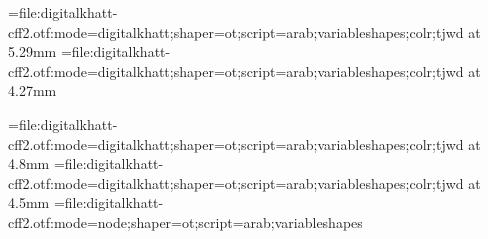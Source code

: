 \edef\pdfcompresslevel{\pdfvariable compresslevel}
\edef\pdfobjcompresslevel{\pdfvariable objcompresslevel}
\edef\pdfgentounicode{\pdfvariable gentounicode}
\newattribute{\tajweedatt}
\newattribute{\sajdaatt}



\newbox\ayaframe
\newcount\suranum


\def\suraline#1{%
\global\advance\suranum by1%
\leavevmode\raise1.2em\hbox to 0pt{\pdfbookmark{\the\suranum. #1}{sura\the\suranum}}%
\hbox to 0pt{\copy\ayaframe\hss}\centerline{\medinasura\textdir TRT#1}%
}%
\def\bismline#1{\centerline{\medinasura\textdir TRT#1}}



\def\sajdabar#1{\setattribute{\sajdaatt}{1}#1\unsetattribute{\sajdaatt}\directlua{addsajdacallback()}%
}

\newdimen\scaledsize 
{}\textwidth%

\font\medinafontvar={file:digitalkhatt-cff2.otf:mode=digitalkhatt;shaper=ot;script=arab;variableshapes;colr;tjwd} at 5.29mm %
\font\medinafontvarmadina={file:digitalkhatt-cff2.otf:mode=digitalkhatt;shaper=ot;script=arab;variableshapes;colr;tjwd} at 4.27mm


\font\medinasura={file:digitalkhatt-cff2.otf:mode=digitalkhatt;shaper=ot;script=arab;variableshapes;colr;tjwd} at 4.8mm
\font\fatiha={file:digitalkhatt-cff2.otf:mode=digitalkhatt;shaper=ot;script=arab;variableshapes;colr;tjwd} at 4.5mm
\font\medinafontvarnode={file:digitalkhatt-cff2.otf:mode=node;shaper=ot;script=arab;variableshapes}

\renewcommand{\baselinestretch}{2.25}
\lineskiplimit=-100pt

\parindent=0pt
\parfillskip=0pt

\def\topglue{\nointerlineskip \vglue-\topskip \vglue}

\def\ayagraphic{\centerline{\lower1em\hbox{\texttt{[image: ayaframe.pdf]}}}}

